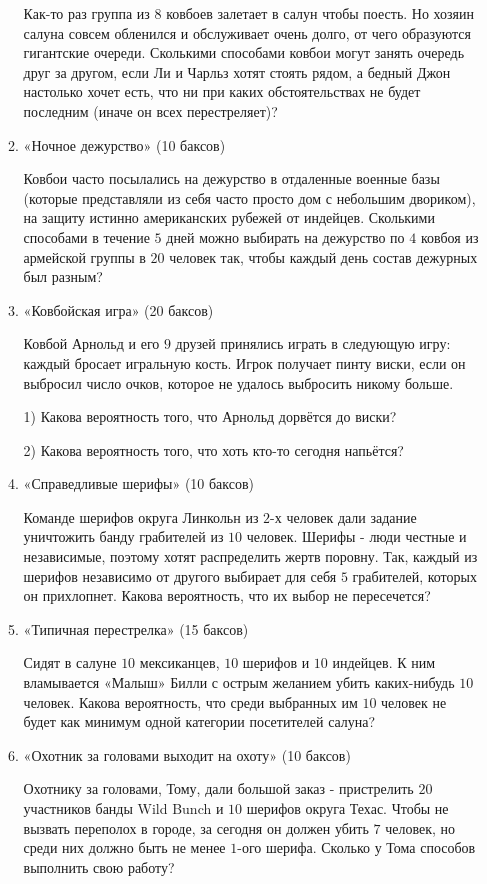 \documentclass[11pt, a4paper]{article}
\theoremstyle{definition}
\begin{document}
\begin{enumerate}
\begin{enumerate}
    Как-то раз группа из $8$ ковбоев залетает в салун чтобы поесть. Но хозяин салуна совсем обленился и обслуживает очень долго, от чего образуются гигантские очереди. Сколькими способами ковбои могут занять очередь друг за другом, если Ли и Чарльз хотят стоять рядом, а бедный Джон настолько хочет есть, что ни при каких обстоятельствах не будет последним (иначе он всех перестреляет)? 
    \item «Ночное дежурство» (10 баксов)
    
    Ковбои часто посылались на дежурство в отдаленные военные базы (которые представляли из себя часто просто дом с небольшим двориком), на защиту истинно американских рубежей от индейцев. Сколькими способами в течение $5$ дней можно выбирать на дежурство по $4$ ковбоя из армейской группы в $20$ человек так, чтобы каждый день состав дежурных был разным?
    \item «Ковбойская игра» (20 баксов)
    
    Ковбой Арнольд и его $9$ друзей принялись играть в следующую игру: каждый бросает игральную кость. Игрок получает пинту виски, если он выбросил число очков, которое не удалось выбросить никому больше.
    
    1) Какова вероятность того, что Арнольд дорвётся до виски?
    
    2) Какова вероятность того, что хоть кто-то сегодня напьётся? 
    \item «Справедливые шерифы» (10 баксов)
    
    Команде шерифов округа Линкольн из $2$-х человек дали задание уничтожить банду грабителей из $10$ человек. Шерифы - люди честные и независимые, поэтому хотят распределить жертв поровну. Так, каждый из шерифов независимо от другого выбирает для себя $5$ грабителей, которых он прихлопнет. Какова вероятность, что их выбор не пересечется?
    \item «Типичная перестрелка» (15 баксов)
    
    Сидят в салуне $10$ мексиканцев, $10$ шерифов и $10$ индейцев. К ним вламывается «Малыш» Билли с острым желанием убить каких-нибудь $10$ человек. Какова вероятность, что среди выбранных им $10$ человек не будет как минимум одной категории посетителей салуна?
    \item «Охотник за головами выходит на охоту» (10 баксов)
    
    Охотнику за головами, Тому, дали большой заказ - пристрелить $20$ участников банды Wild Bunch и $10$ шерифов округа Техас. Чтобы не вызвать переполох в городе, за сегодня он должен убить $7$ человек, но среди них должно быть не менее $1$-ого шерифа. Сколько у Тома способов выполнить свою работу?
\end{enumerate}    
    

\end{enumerate}
\end{document}
